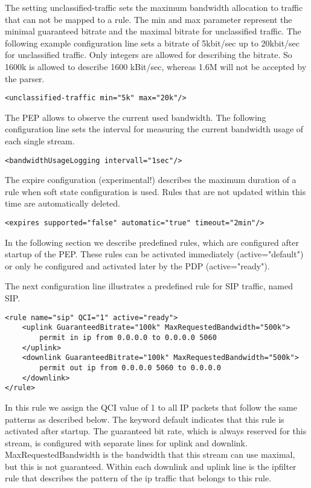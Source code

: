 The setting unclassified-traffic sets the maximum bandwidth allocation to traffic that can not be mapped to a rule. 
The min and max parameter represent the minimal guaranteed bitrate and the maximal bitrate for unclassified traffic. 
The following example configuration line sets a bitrate of 5kbit/sec up to 20kbit/sec for unclassified traffic. 
Only integers are allowed for describing the bitrate. So 1600k is allowed to describe 1600 kBit/sec, whereas 1.6M will not be accepted by the parser. 
\begin{lstlisting}[caption=Bitrates for unclassified traffic, label={lst:PEPContainer}]	
	<unclassified-traffic min="5k" max="20k"/>
\end{lstlisting}

The PEP allows to observe the current used bandwidth. 
The following configuration line sets the interval for measuring the current bandwidth usage of each single stream.
\begin{lstlisting}[caption=bandwidth usage intervall logging, label={lst:PEPContainer}]	
	<bandwidthUsageLogging intervall="1sec"/>
\end{lstlisting}

The expire configuration (experimental!) describes the maximum duration of a rule when soft state configuration is used. 
Rules that are not updated within this time are automatically deleted. 
\begin{lstlisting}[caption=expires configuration, label={lst:PEPContainer}]	
	<expires supported="false" automatic="true" timeout="2min"/>
\end{lstlisting}

In the following section we describe predefined rules, which are configured after startup of the PEP. 
These rules can be activated immediately (active="default") or only be configured and activated later by the PDP (active="ready").

The next configuration line illustrates a predefined rule for SIP traffic, named SIP.
\begin{lstlisting}[caption=predefined rule for SIP, label={lst:PEPContainer}]	
<rule name="sip" QCI="1" active="ready">
	<uplink GuaranteedBitrate="100k" MaxRequestedBandwidth="500k">
		permit in ip from 0.0.0.0 to 0.0.0.0 5060
	</uplink>
	<downlink GuaranteedBitrate="100k" MaxRequestedBandwidth="500k">
		permit out ip from 0.0.0.0 5060 to 0.0.0.0
	</downlink>
</rule>	
\end{lstlisting}

In this rule we assign the QCI value of 1 to all IP packets that follow the same patterns as described below. 
The keyword default indicates that this rule is activated after startup.
The guaranteed bit rate, which is always reserved for this stream, is configured with separate lines for uplink and downlink. 
MaxRequestedBandwidth is the bandwidth that this stream can use maximal, but this is not guaranteed. 
Within each downlink and uplink line is the ipfilter rule that describes the pattern of the ip traffic that belongs to this rule.

